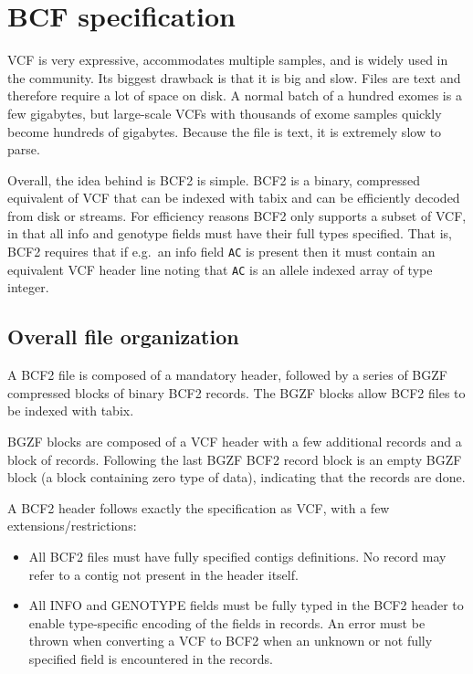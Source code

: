 \documentclass[8pt]{article}
\begin{document}
\pagebreak
\section{BCF specification}

VCF is very expressive, accommodates multiple samples, and is widely used in the community.
Its biggest drawback is that it is big and slow.
Files are text and therefore require a lot of space on disk.
A normal batch of a hundred exomes is a few gigabytes, but large-scale VCFs with thousands of exome samples quickly become hundreds of gigabytes.
Because the file is text, it is extremely slow to parse.

Overall, the idea behind is BCF2 is simple.
BCF2 is a binary, compressed equivalent of VCF that can be indexed with tabix and can be efficiently decoded from disk or streams.
For efficiency reasons BCF2 only supports a subset of VCF, in that all info and genotype fields must have their full types specified.
That is, BCF2 requires that if e.g.\ an info field {\tt AC} is present then it must contain an equivalent VCF header line noting that {\tt AC} is an allele indexed array of type integer.

\subsection{Overall file organization}

A BCF2 file is composed of a mandatory header, followed by a series of BGZF compressed blocks of binary BCF2 records.
The BGZF blocks allow BCF2 files to be indexed with tabix.

BGZF blocks are composed of a VCF header with a few additional records and a block of records.
Following the last BGZF BCF2 record block is an empty BGZF block (a block containing zero type of data), indicating that the records are done.

A BCF2 header follows exactly the specification as VCF, with a few extensions/restrictions:
\begin{itemize}
  \item All BCF2 files must have fully specified contigs definitions.
  No record may refer to a contig not present in the header itself.

  \item All INFO and GENOTYPE fields must be fully typed in the BCF2 header to enable type-specific encoding of the fields in records.
  An error must be thrown when converting a VCF to BCF2 when an unknown or not fully specified field is encountered in the records.
\end{itemize}
\end{document}
